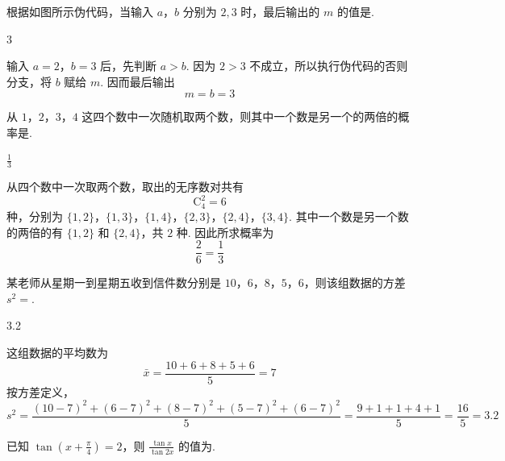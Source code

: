\begin{problem}
根据如图所示伪代码，当输入 \(a\)，\(b\) 分别为 \(2, 3\) 时，最后输出的 \(m\) 的值是\fillinblank{}.

\end{problem}

\begin{answer}
3
\end{answer}

\begin{solution}
输入 \(a=2\)，\(b=3\) 后，先判断 \(a>b\). 因为 \(2>3\) 不成立，所以执行伪代码的否则分支，将 \(b\) 赋给 \(m\). 因而最后输出
\[
m=b=3
\]
\end{solution}

\begin{problem}
从 \(1\)，\(2\)，\(3\)，\(4\) 这四个数中一次随机取两个数，则其中一个数是另一个的两倍的概率是\fillinblank{}.
\end{problem}

\begin{answer}
\(\frac{1}{3}\)
\end{answer}

\begin{solution}
从四个数中一次取两个数，取出的无序数对共有
\[
\mathrm C_4^2=6
\]
种，分别为 \(\{1,2\}\)，\(\{1,3\}\)，\(\{1,4\}\)，\(\{2,3\}\)，\(\{2,4\}\)，\(\{3,4\}\). 其中一个数是另一个数的两倍的有 \(\{1,2\}\) 和 \(\{2,4\}\)，共 \(2\) 种. 因此所求概率为
\[
\frac{2}{6}=\frac{1}{3}
\]
\end{solution}

\begin{problem}
某老师从星期一到星期五收到信件数分别是 \(10\)，\(6\)，\(8\)，\(5\)，\(6\)，则该组数据的方差 \(s^2=\)\fillinblank{}.
\end{problem}

\begin{answer}
3.2
\end{answer}

\begin{solution}
这组数据的平均数为
\[
\bar{x}=\frac{10+6+8+5+6}{5}=7
\]
按方差定义，
\[
s^2=\frac{(10-7)^2+(6-7)^2+(8-7)^2+(5-7)^2+(6-7)^2}{5}
=\frac{9+1+1+4+1}{5}=\frac{16}{5}=3.2
\]
\end{solution}

\begin{problem}
已知 \(\tan\left(x+\frac{\pi}{4}\right)=2\)，则 \(\frac{\tan x}{\tan 2x}\) 的值为\fillinblank{}.
\end{problem}


